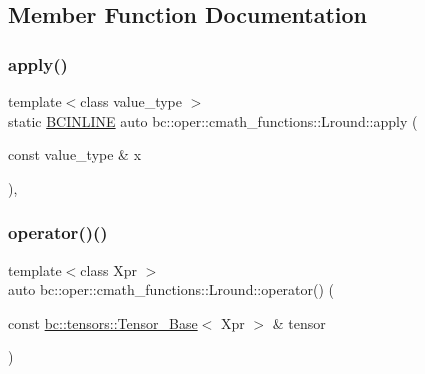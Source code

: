 \subsection{Member Function Documentation}
\mbox{\label{structbc_1_1oper_1_1cmath__functions_1_1Lround_a038919e263e1a034ca714ebb318a9270}} 
\subsubsection{\texorpdfstring{apply()}{apply()}}
{\footnotesize\ttfamily template$<$class value\+\_\+type $>$ \\
static \hyperlink{common_8h_a6699e8b0449da5c0fafb878e59c1d4b1}{B\+C\+I\+N\+L\+I\+NE} auto bc\+::oper\+::cmath\+\_\+functions\+::\+Lround\+::apply (\begin{DoxyParamCaption}\item[{const value\+\_\+type \&}]{x }\end{DoxyParamCaption})\hspace{0.3cm}{\ttfamily [inline]}, {\ttfamily [static]}}

\mbox{\label{structbc_1_1oper_1_1cmath__functions_1_1Lround_ac8bea6158d356acde6d4e481722205a4}} 
\subsubsection{\texorpdfstring{operator()()}{operator()()}\hspace{0.1cm}{\footnotesize\ttfamily [1/3]}}
{\footnotesize\ttfamily template$<$class Xpr $>$ \\
auto bc\+::oper\+::cmath\+\_\+functions\+::\+Lround\+::operator() (\begin{DoxyParamCaption}\item[{const \hyperlink{classbc_1_1tensors_1_1Tensor__Base}{bc\+::tensors\+::\+Tensor\+\_\+\+Base}$<$ Xpr $>$ \&}]{tensor }\end{DoxyParamCaption})\hspace{0.3cm}{\ttfamily [inline]}}

